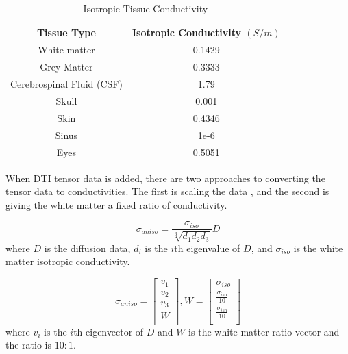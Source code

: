 \begin{table}[H]
\centering
\caption{Isotropic Tissue Conductivity}
\label{tab:cond}
\begin{tabular}{|c|c|}
\hline
Tissue Type               & Isotropic Conductivity $(S/m)$ \\ \hline
White matter              & 0.1429                         \\ \hline
Grey Matter               & 0.3333                         \\ \hline
Cerebrospinal Fluid (CSF) & 1.79                           \\ \hline
Skull                     & 0.001                          \\ \hline
Skin                      & 0.4346                         \\ \hline
Sinus                     & 1e-6                           \\ \hline
Eyes                      & 0.5051                         \\ \hline
\end{tabular}
\end{table}

When DTI tensor data is added, there are two approaches to converting the tensor data to conductivities. The first is scaling the data \cite{ref:scaling}, and the second is giving the white matter a fixed ratio of conductivity. 

\begin{equation}
\sigma_{aniso} = \frac{\sigma_{iso}}{\sqrt[3]{d_1d_2d_3}}D
\end{equation}
where $D$ is the diffusion data, $d_i$ is the $i$th eigenvalue of $D$, and $\sigma_{iso}$ is the white matter isotropic conductivity.

\begin{equation}
\sigma_{aniso} = \begin{bmatrix}
v_1\\
v_2\\
v_3\\
W\\
\end{bmatrix}, 
W = \begin{bmatrix}
\sigma_{iso}\\
\frac{\sigma_{iso}}{10}\\
\frac{\sigma_{iso}}{10}\\
\end{bmatrix}
\end{equation}
where $v_i$ is the $i$th eigenvector of $D$ and $W$ is the white matter ratio vector and the ratio is $10:1$.

